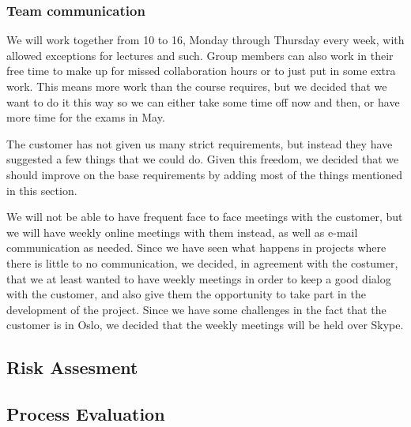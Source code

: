 \documentclass[12pt]{article}
\begin{document}
    
    
    
    \subsubsection {Team communication}
    We will work together from 10 to 16, Monday through Thursday every week, with allowed exceptions for lectures and such. Group members can also work in their free time to make up for missed collaboration hours or to just put in some extra work. This means more work than the course requires, but we decided that we want to do it this way so we can either take some time off now and then, or have more time for the exams in May.

    The customer has not given us many strict requirements, but instead they have suggested a few things that we could do. Given this freedom, we decided that we should improve on the base requirements by adding most of the things mentioned in this section.
    
    We will not be able to have frequent face to face meetings with the customer, but we will have weekly online meetings with them instead, as well as e-mail communication as needed. Since we have seen what happens in projects where there is little to no communication, we decided, in agreement with the costumer, that we at least wanted to have weekly meetings in order  to keep a good dialog with the customer, and also give them the opportunity to take part in the development of the project. Since we have some challenges in the fact that the customer is in Oslo, we decided that the weekly meetings will be held over Skype.
    
    \subsection{Risk Assesment}\label{risk}
    
    \subsection{Process Evaluation}\label{processevaluation}
    
\end{document}
